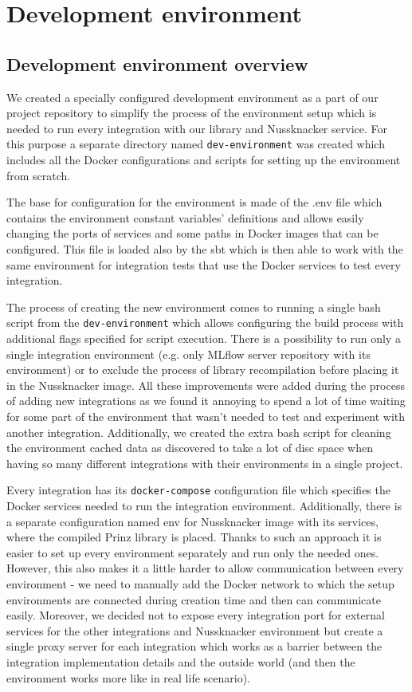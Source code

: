 \chapter{Development environment}
\label{chap:devenv}

\section{Development environment overview}

We created a specially configured development environment as a part of our project repository to
simplify the process of the environment setup which is needed to run every integration with our
library and Nussknacker service. For this purpose a separate directory named \texttt{dev-environment} was
created which includes all the Docker configurations and scripts for setting up the environment
from scratch.

The base for configuration for the environment is made of the .env file which contains the environment
constant variables’ definitions and allows easily changing the ports of services and some paths in
Docker images that can be configured. This file is loaded also by the sbt which is then able to work
with the same environment for integration tests that use the Docker services to test
every integration.

The process of creating the new environment comes to running a single bash script from the \texttt{dev-environment}
which allows configuring the build process with additional flags specified for script execution. There is
a possibility to run only a single integration environment (e.g. only MLflow server repository with its
environment) or to exclude the process of library recompilation before placing it in the Nussknacker image.
All these improvements were added during the process of adding new integrations as we found it annoying
to spend a lot of time waiting for some part of the environment that wasn’t needed to test
and experiment with another integration. Additionally, we created the extra bash script for cleaning
the environment cached data as discovered to take a lot of disc space when having so many different
integrations with their environments in a single project.

Every integration has its \texttt{docker-compose} configuration file which specifies the Docker services
needed to run the integration environment. Additionally, there is a separate configuration named env
for Nussknacker image with its services, where the compiled Prinz library is placed. Thanks to
such an approach it is easier to set up every environment separately and run only the needed ones.
However, this also makes it a little harder to allow communication between every environment - we need
to manually add the Docker network to which the setup environments are connected during creation
time and then can communicate easily. Moreover, we decided not to expose every integration port for
external services for the other integrations and Nussknacker environment but create a single proxy
server for each integration which works as a barrier between the integration implementation details
and the outside world (and then the environment works more like in real life scenario).

